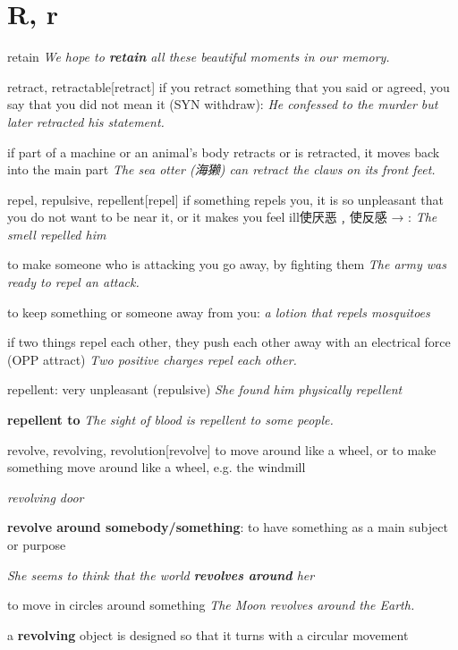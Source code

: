 \section{R, r}

\begin{DefWord}{retain}
    \textit{We hope to \textbf{retain} all these beautiful moments in our memory.}
\end{DefWord}

\begin{DefWord}{retract, retractable}[retract]
    if you retract something that you said or agreed, you say that you did not mean it (SYN  withdraw):
    \textit{He confessed to the murder but later retracted his statement.}

    if part of a machine or an animal's body retracts or is retracted, it moves back into the main part
    \textit{The sea otter (海獭) can retract the claws on its front feet.}
\end{DefWord}

\begin{DefWord}{repel, repulsive, repellent}[repel]
    if something repels you, it is so unpleasant that you do not want to be near it, or it makes you feel ill使厌恶﹐使反感 → :
    \textit{The smell repelled him}

    to make someone who is attacking you go away, by fighting them
    \textit{The army was ready to repel an attack.}

    to keep something or someone away from you:
    \textit{a lotion that repels mosquitoes}

    if two things repel each other, they push each other away with an electrical force (OPP attract)
    \textit{Two positive charges repel each other.}

    repellent: very unpleasant (repulsive)
    \textit{She found him physically repellent}

    \textbf{repellent to}
    \textit{The sight of blood is repellent to some people.}

\end{DefWord}

\begin{DefWord}{revolve, revolving, revolution}[revolve]
    to move around like a wheel, or to make something move around like a wheel, e.g. the windmill

    \textit{revolving door}

    \textbf{revolve around somebody/something}:
    to have something as a main subject or purpose
    
    \textit{She seems to think that the world \textbf{revolves around} her}

    to move in circles around something
    \textit{The Moon revolves around the Earth.}

    a \textbf{revolving} object is designed so that it turns with a circular movement

\end{DefWord}

